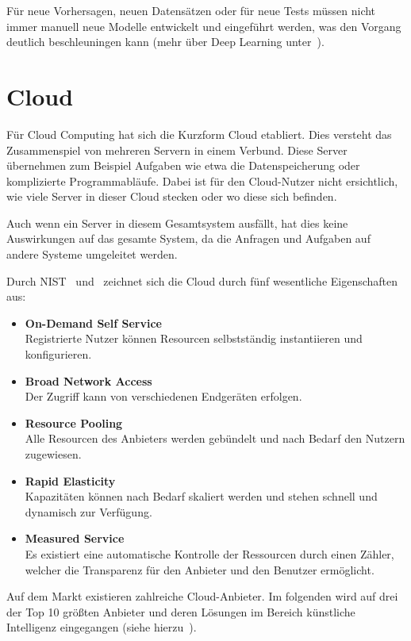 Für neue Vorhersagen, neuen Datensätzen oder für neue Tests müssen nicht immer manuell neue Modelle entwickelt und
eingeführt werden, was den Vorgang deutlich beschleuningen kann (mehr über Deep Learning
unter~\cite{book_grundlagen_machinelearning}).

\section{Cloud}
Für Cloud Computing hat sich die Kurzform Cloud etabliert. Dies versteht das Zusammenspiel von mehreren Servern in einem
Verbund. Diese Server übernehmen zum Beispiel Aufgaben wie etwa die Datenspeicherung oder komplizierte Programmabläufe.
Dabei ist für den Cloud-Nutzer nicht ersichtlich, wie viele Server in dieser Cloud stecken oder wo diese sich befinden.

Auch wenn ein Server in diesem Gesamtsystem ausfällt, hat dies keine Auswirkungen auf das gesamte System, da die
Anfragen und Aufgaben auf andere Systeme umgeleitet werden.

Durch NIST~\cite{online_grundlagen_cloud_nist} und~\cite{online_grundlagen_cloud_computing} zeichnet sich die Cloud
durch fünf wesentliche Eigenschaften aus:

\begin{itemize}
    \item \textbf{On-Demand Self Service} \\
    Registrierte Nutzer können Resourcen selbstständig instantiieren und konfigurieren.
    \item \textbf{Broad Network Access} \\
    Der Zugriff kann von verschiedenen Endgeräten erfolgen.
    \item \textbf{Resource Pooling} \\
    Alle Resourcen des Anbieters werden gebündelt und nach Bedarf den Nutzern zugewiesen.
    \item \textbf{Rapid Elasticity} \\
    Kapazitäten können nach Bedarf skaliert werden und stehen schnell und dynamisch zur Verfügung.
    \item \textbf{Measured Service} \\
    Es existiert eine automatische Kontrolle der Ressourcen durch einen Zähler, welcher die Transparenz für den
    Anbieter und den Benutzer ermöglicht.
\end{itemize}

Auf dem Markt existieren zahlreiche Cloud-Anbieter. Im folgenden wird auf drei der Top 10 größten Anbieter und deren
Lösungen im Bereich künstliche Intelligenz eingegangen (siehe hierzu~\cite{online_grundlagen_cloud}).

